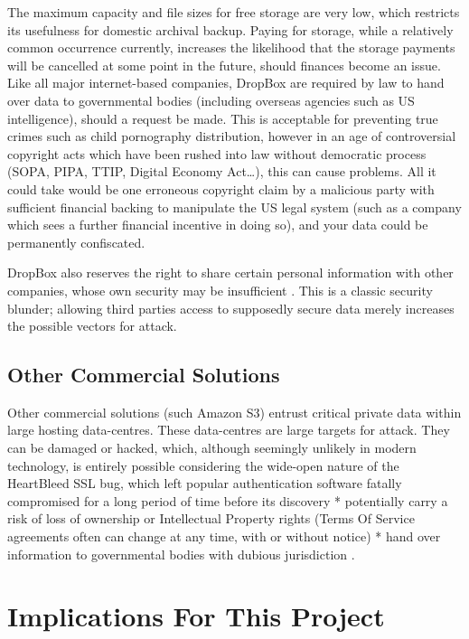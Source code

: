 \documentclass[12pt,a4paper,]{adreport}
\begin{document}
The maximum capacity and file sizes for free storage are very low, which
restricts its usefulness for domestic archival backup. Paying for
storage, while a relatively common occurrence currently, increases the
likelihood that the storage payments will be cancelled at some point in
the future, should finances become an issue. Like all major
internet-based companies, DropBox are required by law to hand over data
to governmental bodies (including overseas agencies such as US
intelligence), should a request be made. This is acceptable for
preventing true crimes such as child pornography distribution, however
in an age of controversial copyright acts which have been rushed into
law without democratic process (SOPA, PIPA, TTIP, Digital Economy
Act\ldots{})\cite{Guardian}, this can cause problems. All it could take would be one erroneous copyright claim by a malicious party with sufficient financial backing to manipulate the US legal system (such as a company which sees a further financial incentive in doing so), and your data could be permanently confiscated.

DropBox also reserves the right to share certain personal information
with other companies, whose own security may be insufficient \cite{otherShit}. This is a classic security blunder; allowing third
parties access to supposedly secure data merely increases the possible
vectors for attack.

\subsection{Other Commercial
Solutions}\label{other-commercial-solutions}

Other commercial solutions (such Amazon S3) entrust critical private
data within large hosting data-centres. These data-centres are large
targets for attack. They can be damaged or hacked, which, although
seemingly unlikely in modern technology, is entirely possible
considering the wide-open nature of the HeartBleed SSL bug, which left
popular authentication software fatally compromised for a long period of
time before its discovery \cite{HB} * potentially carry a
risk of loss of ownership or Intellectual Property rights (Terms Of
Service agreements often can change at any time, with or without notice)
* hand over information to governmental bodies with dubious
jurisdiction \cite{MagMurph}.

\section{Implications For This
Project}\label{implications-for-this-project}
\end{document}
